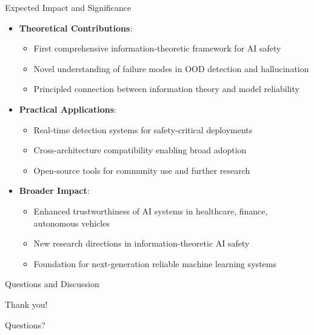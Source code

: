 \documentclass[aspectratio=169]{beamer}
\begin{document}
\begin{frame}{Expected Impact and Significance}
\begin{itemize}
    \item \textbf{Theoretical Contributions}:
    \begin{itemize}
        \item First comprehensive information-theoretic framework for AI safety
        \item Novel understanding of failure modes in OOD detection and hallucination
        \item Principled connection between information theory and model reliability
    \end{itemize}
    \item \textbf{Practical Applications}:
    \begin{itemize}
        \item Real-time detection systems for safety-critical deployments
        \item Cross-architecture compatibility enabling broad adoption
        \item Open-source tools for community use and further research
    \end{itemize}
    \item \textbf{Broader Impact}:
    \begin{itemize}
        \item Enhanced trustworthiness of AI systems in healthcare, finance, autonomous vehicles
        \item New research directions in information-theoretic AI safety
        \item Foundation for next-generation reliable machine learning systems
    \end{itemize}
\end{itemize}
\end{frame}

\begin{frame}{Questions and Discussion}
\begin{center}
\Huge Thank you!

\vspace{2cm}

\Large Questions?
\end{center}
\end{frame}
\end{document}

